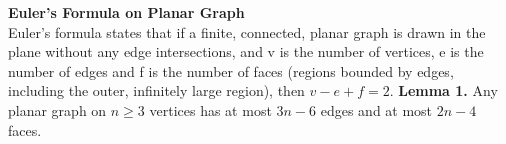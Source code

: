 \begin{large}
  \textbf{Euler's Formula on Planar Graph} \\
  Euler's formula states that if a finite, connected, planar graph is drawn in the plane without any edge intersections, and v is the number of vertices, e is the number of edges and f is the number of faces (regions bounded by edges, including the outer, infinitely large region), then $v - e + f = 2$. \newline
  \textbf{Lemma 1.} Any planar graph on $n \ge 3$ vertices has at most $3n - 6$ edges and at most $2n - 4$ faces.
\end{large}
